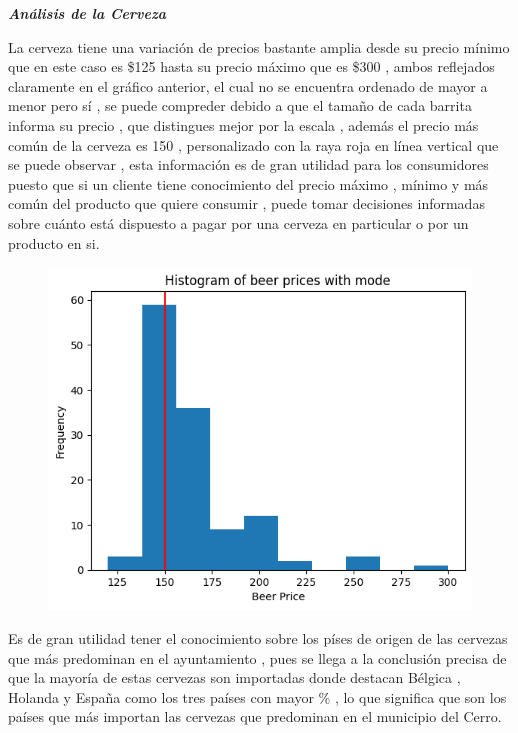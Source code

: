 \documentclass[10pt]{beamer}
\begin{document}
   	
   	\begin{frame}{\textbf{\textit{Análisis de la Cerveza}}}
   		
   	   La cerveza tiene una variación de precios bastante amplia desde su precio mínimo que en este caso es \$125 hasta su precio máximo que es \$300 , ambos reflejados claramente en el gráfico anterior, el cual no se encuentra ordenado de mayor a menor pero sí , se puede compreder debido a que el tamaño de cada barrita informa su precio , que distingues mejor por la escala , además el precio más común de la cerveza es 150 , personalizado con la raya roja en línea vertical que se puede observar , esta información es de gran utilidad para los consumidores puesto que si un cliente tiene conocimiento del precio máximo , mínimo y más común del producto que quiere consumir , puede tomar decisiones informadas sobre cuánto está dispuesto a pagar por una cerveza en particular o por un producto en si.
   	   
   	\end{frame}
   	
   	\begin{frame}
   		
   	\begin{figure}
   		\centering
   		\includegraphics[width=0.7\linewidth]{"FIGURA/gráfico precios cerveza"}
   		\caption{}
   		\label{fig:grafico-precios-cerveza}
   	\end{figure}
   	
   	\end{frame}
   	
    
    \begin{frame}
    	
     Es de gran utilidad tener el conocimiento sobre los píses de origen de las cervezas que más predominan en el ayuntamiento , pues se llega a la conclusión precisa de que la mayoría de estas cervezas son importadas donde destacan Bélgica , Holanda y España como los tres países con mayor \% , lo que significa que son los países que más importan las cervezas que predominan en el municipio del Cerro.
    	
    \end{frame}
   	
\end{document}
